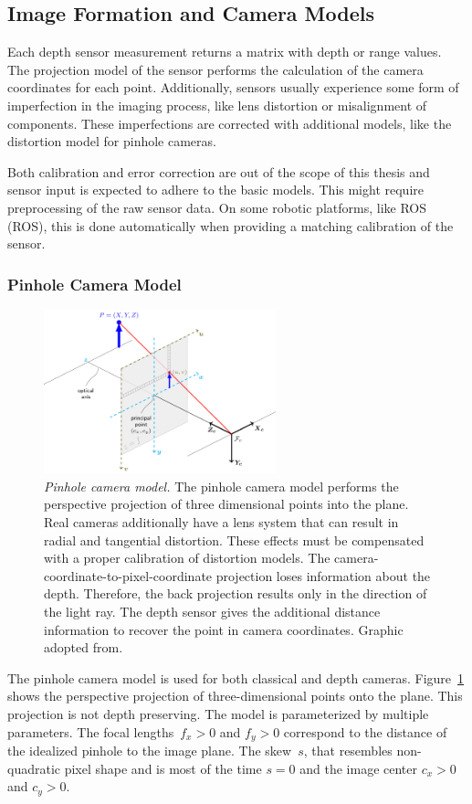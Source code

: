 \subsection{Image Formation and Camera Models}

Each depth sensor measurement returns a matrix with depth or range values.
The projection model of the sensor performs the calculation of the camera coordinates for each point.
Additionally, sensors usually experience some form of imperfection in the imaging process, like lens distortion or misalignment of components.
These imperfections are corrected with additional models, like the distortion model for pinhole cameras.

Both calibration and error correction are out of the scope of this thesis and sensor input is expected to adhere to the basic models.
This might require preprocessing of the raw sensor data.
On some robotic platforms, like \acrshort{ROS} (\acrlong{ROS}), this is done automatically when providing a matching calibration of the sensor.

\subsubsection{Pinhole Camera Model}\label{sec:pinhole_model}

\begin{figure}[htb]
    \includegraphics[width=0.6\textwidth]{chapter03/img/pinhole_camera_model.png}
    \caption[Pinhole camera model]{\emph{Pinhole camera model.} The pinhole camera model performs the perspective projection of three dimensional points into the plane. Real cameras additionally have a lens system that can result in radial and tangential distortion. These effects must be compensated with a proper calibration of distortion models. The camera-coordinate-to-pixel-coordinate projection loses information about the depth. Therefore, the back projection results only in the direction of the light ray. The depth sensor gives the additional distance information to recover the point in camera coordinates. Graphic adopted from\cite{opencv_pinhole}.}\label{fig:pinhole_model}
\end{figure}
The pinhole camera model is used for both classical and depth cameras.
Figure~\ref{fig:pinhole_model} shows the perspective projection of three-dimensional points onto the plane\cite[p. 25-35]{hartley_2004}.
This projection is not depth preserving.
The model is parameterized by multiple parameters.
The focal lengths~$f_x > 0$ and $f_y > 0$ correspond to the distance of the idealized pinhole to the image plane.
The skew~$s$, that resembles non-quadratic pixel shape and is most of the time $s = 0$ and the image center $c_x > 0$ and $c_y > 0$.

